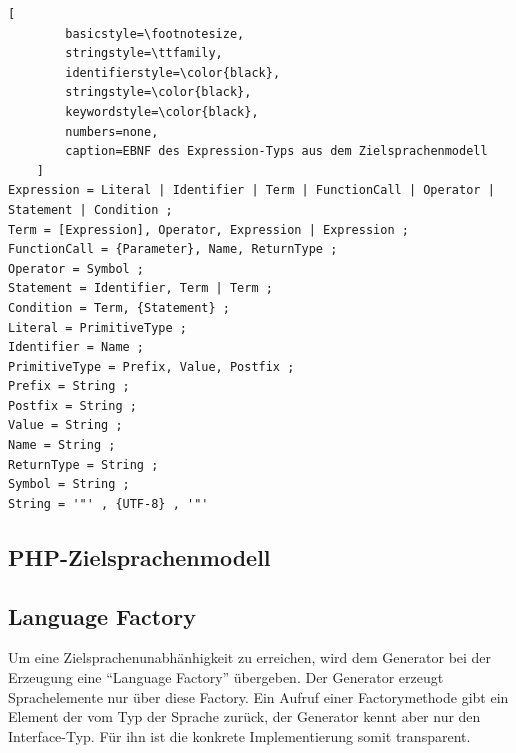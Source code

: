 \begin{lstlisting}[
        basicstyle=\footnotesize,
        stringstyle=\ttfamily,
        identifierstyle=\color{black},
        stringstyle=\color{black},
        keywordstyle=\color{black},
        numbers=none,
        caption=EBNF des Expression-Typs aus dem Zielsprachenmodell
    ]
Expression = Literal | Identifier | Term | FunctionCall | Operator | Statement | Condition ;
Term = [Expression], Operator, Expression | Expression ;
FunctionCall = {Parameter}, Name, ReturnType ;
Operator = Symbol ;
Statement = Identifier, Term | Term ;
Condition = Term, {Statement} ;
Literal = PrimitiveType ;
Identifier = Name ;
PrimitiveType = Prefix, Value, Postfix ;
Prefix = String ;
Postfix = String ;
Value = String ;
Name = String ;
ReturnType = String ;
Symbol = String ;
String = '"' , {UTF-8} , '"'

\end{lstlisting}

\subsection{PHP-Zielsprachenmodell}
\label{sec:php_target_language_model}

\subsection{Language Factory}
\label{sec:language_factory}

Um eine Zielsprachenunabhänhigkeit zu erreichen, wird dem Generator bei der Erzeugung eine \enquote{Language Factory} übergeben. Der Generator erzeugt Sprachelemente nur über diese Factory. Ein Aufruf einer Factorymethode gibt ein Element der vom Typ der Sprache zurück, der Generator kennt aber nur den Interface-Typ. Für ihn ist die konkrete Implementierung somit transparent.
